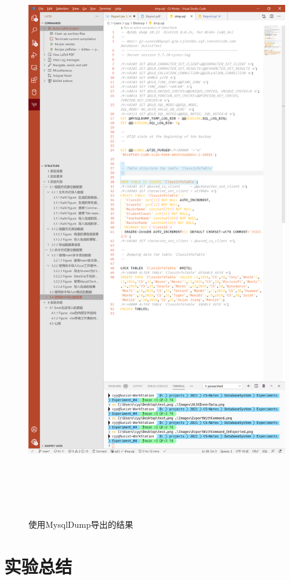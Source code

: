 \documentclass[a4paper,UTF8,heading=false,12pt]{article}
\begin{document}
\begin{figure}[htbp]
    \centering
    \includegraphics[height=25cm]{../Images/ExportWithCommand_ExportFile.png}
    \caption{使用MysqlDump导出的结果}
\end{figure}

\newpage

\section{实验总结}
\end{document}
